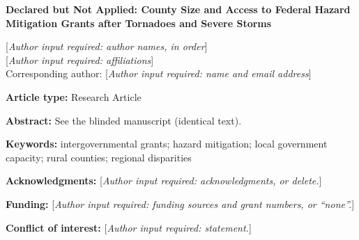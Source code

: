 \documentclass[12pt]{article}
\newcommand{\authorinput}[1]{\textcolor{red!70!black}{[\textit{Author input required: #1}]}}
\begin{document}
\begin{center}
{\Large\bfseries Declared but Not Applied: County Size and Access to Federal Hazard Mitigation Grants after Tornadoes and Severe Storms\par}
\bigskip
\authorinput{author names, in order}\\[4pt]
\authorinput{affiliations}\\[4pt]
Corresponding author: \authorinput{name and email address}
\end{center}

\bigskip
\noindent\textbf{Article type:} Research Article

\medskip
\noindent\textbf{Abstract:} See the blinded manuscript (identical text).

\medskip
\noindent\textbf{Keywords:} intergovernmental grants; hazard mitigation; local government capacity; rural counties; regional disparities

\medskip
\noindent\textbf{Acknowledgments:} \authorinput{acknowledgments, or delete.}

\medskip
\noindent\textbf{Funding:} \authorinput{funding sources and grant numbers, or ``none''.}

\medskip
\noindent\textbf{Conflict of interest:} \authorinput{statement.}
\end{document}
